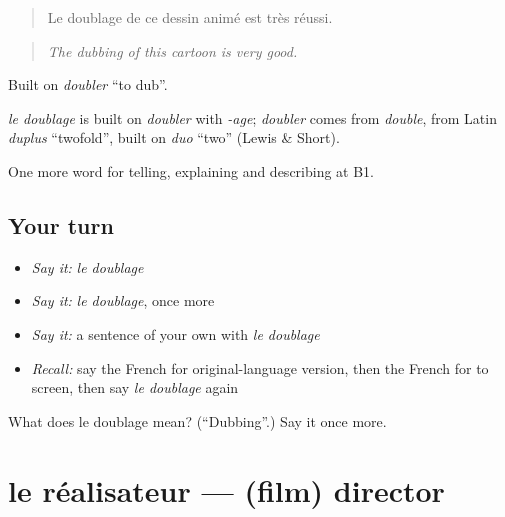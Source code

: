 \begin{quote}
Le doublage de ce dessin animé est très réussi.
\end{quote}

\begin{quote}
\emph{The dubbing of this cartoon is very good.}
\end{quote}

Built on \emph{doubler} \textquotedblleft{}to dub\textquotedblright{}.

\begin{cousinweb}
\emph{le doublage} is built on \emph{doubler} with \emph{-age}; \emph{doubler} comes from \emph{double}, from Latin \emph{duplus} \textquotedblleft{}twofold\textquotedblright{}, built on \emph{duo} \textquotedblleft{}two\textquotedblright{} (Lewis \& Short).
\end{cousinweb}

\begin{grammarlens}[title={What you've built}]
One more word for telling, explaining and describing at B1.
\end{grammarlens}

\subsection*{Your turn}
\begin{itemize}
\raggedright
  \item \emph{Say it:} \emph{le doublage}
  \item \emph{Say it:} \emph{le doublage}, once more
  \item \emph{Say it:} a sentence of your own with \emph{le doublage}
  \item \emph{Recall:} say the French for original-language version, then the French for to screen, then say \emph{le doublage} again
\end{itemize}

\begin{tcolorbox}[breakable,colback=teal!4,colframe=teal!35!black,title={Before you move on}]
What does le doublage mean? (\textquotedblleft{}Dubbing\textquotedblright{}.) Say it once more.
\end{tcolorbox}
\section[le réalisateur]{le réalisateur — (film) director}

\label{lesson:FR-C524-realisateur}



